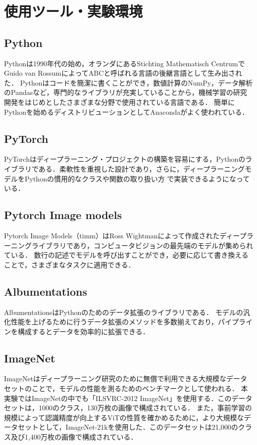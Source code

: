 \documentclass[a4paper, oneside, openany, dvipdfmx]{suribt}%
\begin{document}
\section{使用ツール・実験環境}
\subsection{Python}
Pythonは1990年代の始め，オランダにあるStichting Mathematisch CentrumでGuido van RossumによってABCと呼ばれる言語の後継言語として生み出された．
Pythonはコードを簡潔に書くことができ，数値計算のNumPy，データ解析のPandasなど，専門的なライブラリが充実していることから，機械学習の研究開発をはじめとしたさまざまな分野で使用されている言語である．
簡単にPythonを始めるディストリビューションとしてAnacondaがよく使われている．
\subsection{PyTorch}
PyTorchはディープラーニング・プロジェクトの構築を容易にする，Pythonのライブラリである．柔軟性を重視した設計であり，さらに，ディープラーニングモデルをPythonの慣用的なクラスや関数の取り扱い方
で実装できるようになっている．
\subsection{Pytorch Image models}
Pytorch Image Models（timm）はRoss Wightmanによって作成されたディープラーニングライブラリであり，コンピュータビジョンの最先端のモデルが集められている．
数行の記述でモデルを呼び出すことができ，必要に応じて書き換えることで，さまざまなタスクに適用できる．
\subsection{Albumentations}
AlbumentationsはPythonのためのデータ拡張のライブラリである．
モデルの汎化性能を上げるために行うデータ拡張のメソッドを多数揃えており，パイプラインを構成するとデータを効率的に拡張できる．
\subsection{ImageNet}
ImageNetはディープラーニング研究のために無償で利用できる大規模なデータセットのことで，モデルの性能を測るためのベンチマークとして使われる．
本実験ではImageNetの中でも「ILSVRC-2012 ImageNet」を使用する．このデータセットは，1000のクラス，130万枚の画像で構成されている．
また，事前学習の規模によって認識精度が向上するViTの性質を確かめるために，より大規模なデータセットとして，ImageNet-21kを使用した．このデータセットは21,000のクラス及び1,400万枚の画像で構成されている．
\end{document}
